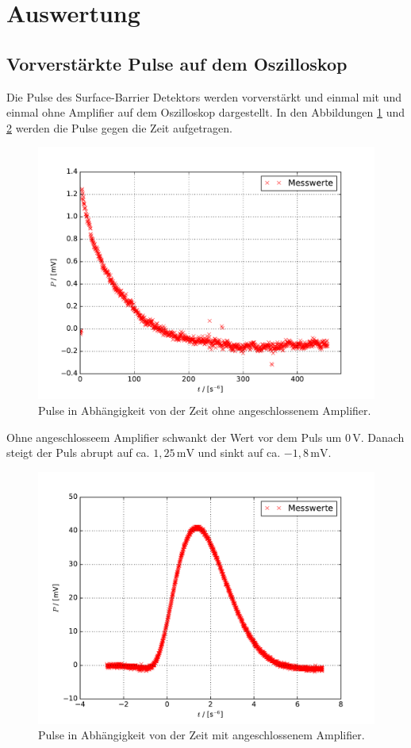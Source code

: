 \section{Auswertung}
\subsection{Vorverstärkte Pulse auf dem Oszilloskop}
\label{VPO}
Die Pulse des Surface-Barrier Detektors werden vorverstärkt und einmal mit und einmal ohne Amplifier auf dem Oszilloskop dargestellt.
In den Abbildungen \ref{fig:2} und \ref{fig:1} werden die Pulse gegen die Zeit aufgetragen.

\begin{figure}[H]
  \centering
  \includegraphics[width=\textwidth]{osz2.pdf}
  \caption{Pulse in Abhängigkeit von der Zeit ohne angeschlossenem Amplifier.}
  \label{fig:2}
\end{figure}

Ohne angeschlosseem Amplifier schwankt der Wert vor dem Puls um $0\,\text{V}$.
Danach steigt der Puls abrupt auf ca. $1,25\,\text{mV}$ und sinkt auf ca. $-1,8\,\text{mV}$.

\begin{figure}[H]
  \centering
  \includegraphics[width=\textwidth]{osz1.pdf}
  \caption{Pulse in Abhängigkeit von der Zeit mit angeschlossenem Amplifier.}
  \label{fig:1}
\end{figure}

